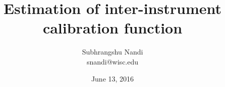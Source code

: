 \documentclass[12pt]{article}
\begin{document}
\title{Estimation of inter-instrument calibration function}

\author{Subhrangshu Nandi \\
	snandi@wisc.edu}
\date{June 13, 2016}

\maketitle






%


%
\end{document}
